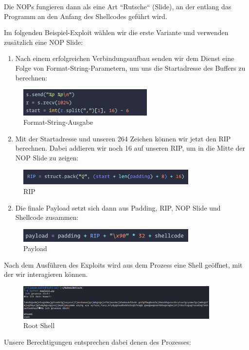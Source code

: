 Die NOPs fungieren dann als eine Art “Rutsche“ (Slide), an der entlang das Programm an den Anfang des
Shellcodes geführt wird.

\pagebreak

Im folgenden Beispiel-Exploit wählen wir die erste Variante und verwenden zusätzlich eine NOP Slide:
\begin{enumerate}
    \item Nach einem erfolgreichen Verbindungsaufbau senden wir dem Dienst eine Folge von Format-String-Parametern, um uns die Startadresse des Buffers zu berechnen:
\end{enumerate}
\begin{figure}[h]
    \centering
    \includegraphics[width=0.6\textwidth,height=0.75\textheight,keepaspectratio]{images/format.png}
    \caption{Format-String-Ausgabe}
\end{figure}

\begin{enumerate}
    \setcounter{enumi}{1}
    \item Mit der Startadresse und unseren 264 Zeichen können wir jetzt den RIP berechnen. Dabei addieren wir noch 16 auf unseren RIP, um in die Mitte der NOP Slide zu zeigen:
\end{enumerate}
\begin{figure}[h]
    \centering
    \includegraphics[width=0.8\textwidth,keepaspectratio]{images/rip.png}
    \caption{RIP}
\end{figure}

\begin{enumerate}
    \setcounter{enumi}{1}
    \item Die finale Payload setzt sich dann aus Padding, RIP, NOP Slide und Shellcode zusammen:
\end{enumerate}
\begin{figure}[h]
    \centering
    \includegraphics[width=0.8\textwidth,keepaspectratio]{images/payload.png}
    \caption{Payload}
\end{figure}

Nach dem Ausführen des Exploits wird aus dem Prozess eine Shell geöffnet, mit der wir interagieren können.
\begin{figure}[b!]
    \centering
    \includegraphics[width=0.9\textwidth,keepaspectratio]{images/root.png}
    \caption{Root Shell}
\end{figure}
Unsere Berechtigungen entsprechen dabei denen des Prozesses: